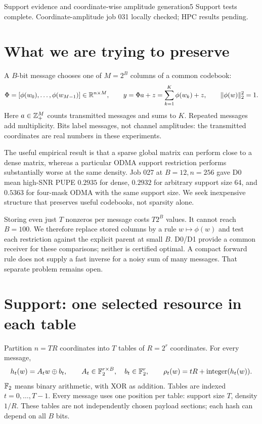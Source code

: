 \documentclass[11pt]{article}
\begin{document}
{Support evidence and coordinate-wise amplitude generation}{5}
{Support tests complete. Coordinate-amplitude job 031 locally checked; HPC results pending.}

\section{What we are trying to preserve}

A $B$-bit message chooses one of $M=2^B$ columns of a common codebook:
\[
 \Phi=[\phi(w_0),\ldots,\phi(w_{M-1})]\in\mathbb{R}^{n\times M},\qquad
 y=\Phi a+z=\sum_{k=1}^{K}\phi(w_k)+z,\qquad \|\phi(w)\|_2^2=1.
\]
Here $a\in\mathbb{Z}_+^M$ counts transmitted messages and sums to $K$. Repeated messages add multiplicity.
Bits label messages, not channel amplitudes: the transmitted coordinates are real numbers in these experiments.

The useful empirical result is that a sparse global matrix can perform close to a dense matrix, whereas a particular
ODMA support restriction performs substantially worse at the same density. Job 027 at $B=12,n=256$ gave D0 mean
high-SNR PUPE $0.2935$ for dense, $0.2932$ for arbitrary support size 64, and $0.5363$ for four-mask ODMA with
the same support size. We seek inexpensive structure that preserves useful codebooks, not sparsity alone.

Storing even just $T$ nonzeros per message costs $T2^B$ values. It cannot reach $B=100$. We therefore replace stored
columns by a rule $w\mapsto\phi(w)$ and test each restriction against the explicit parent at small $B$.
D0/D1 provide a common receiver for these comparisons; neither is certified optimal. A compact forward rule does
not supply a fast inverse for a noisy sum of many messages. That separate problem remains open.

\section{Support: one selected resource in each table}

Partition $n=TR$ coordinates into $T$ tables of $R=2^r$ coordinates. For every message,
\[
 h_t(w)=A_tw\oplus b_t,\qquad A_t\in\mathbb{F}_2^{r\times B},\quad b_t\in\mathbb{F}_2^r,\qquad
 \rho_t(w)=tR+\operatorname{integer}(h_t(w)).
\]
$\mathbb{F}_2$ means binary arithmetic, with XOR as addition. Tables are indexed $t=0,\ldots,T-1$.
Every message uses one position per table: support size $T$, density $1/R$.
These tables are not independently chosen payload sections; each hash can depend on all $B$ bits.
\end{document}
